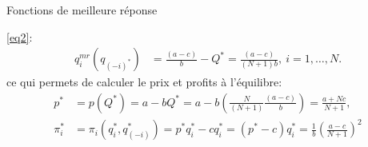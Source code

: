 \begin{frame}[allowframebreaks]{Fonctions de meilleure réponse}
\begin{itemize}
            \eqref{eq2}:
            \begin{align*} 
                q_i^{mr}(q_{(-i)^*}) &= \frac{(a-c)}{b} - Q^* = \frac{(a-c)}{(N+1)b}, \ i=1, \ldots, N.
            \end{align*}
            ce qui permets de calculer le prix et profits à l'équilibre: 
            \begin{align*}
                p^* &=p(Q^*) = a-bQ^* = a-b\left(\frac{N}{(N+1)}\frac{(a-c)}{b}\right)=\frac{a+Nc}{N+1},\\
                \pi_i^* &=\pi_i(q_i^*,q_{(-i)}^*)=p^*q_i^* - cq_i^* = (p^*-c)q_i^* =\frac{1}{b}\left(\frac{a-c}{N+1}\right)^2
            \end{align*}    
    \end{itemize}
\end{frame}

